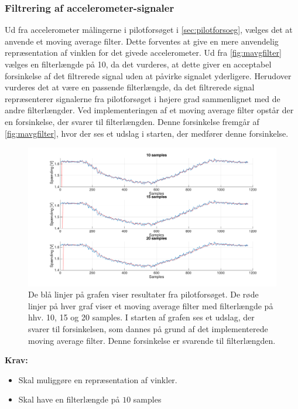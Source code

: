 \subsubsection{Filtrering af accelerometer-signaler} \label{sec:mavg_krav}
Ud fra accelerometer målingerne i pilotforsøget i \autoref{sec:pilotforsoeg}, vælges det at anvende et moving average filter. Dette forventes at give en mere anvendelig repræsentation af vinklen for det givede accelerometer. Ud fra \autoref{fig:mavgfilter} vælges en filterlængde på 10, da det vurderes, at dette giver en acceptabel forsinkelse af det filtrerede signal uden at påvirke signalet yderligere. Herudover vurderes det at være en passende filterlængde, da det filtrerede signal repræsenterer signalerne fra pilotforsøget i højere grad sammenlignet med de andre filterlængder. Ved implementeringen af et moving average filter opstår der en forsinkelse, der svarer til filterlængden. Denne forsinkelse fremgår af \autoref{fig:mavgfilter}, hvor der ses et udslag i starten, der medfører denne forsinkelse. 

\begin{figure} [H]
\centering
\includegraphics[width=1.2\textwidth]{figures/problemloesning/mavgfilter_matlab} 
\caption{De blå linjer på grafen viser resultater fra pilotforsøget. De røde linjer på hver graf viser et moving average filter med filterlængde på hhv. 10, 15 og 20 samples. I starten af grafen ses et udslag, der svarer til forsinkelsen, som dannes på grund af det implementerede moving average filter. Denne forsinkelse er svarende til filterlængden.}
\label{fig:mavgfilter}
\end{figure}

\vspace{3mm}

\textbf{Krav:}
\begin{itemize}
\item Skal muliggøre en repræsentation af vinkler. 
\item Skal have en filterlængde på $10$ samples
\end{itemize}